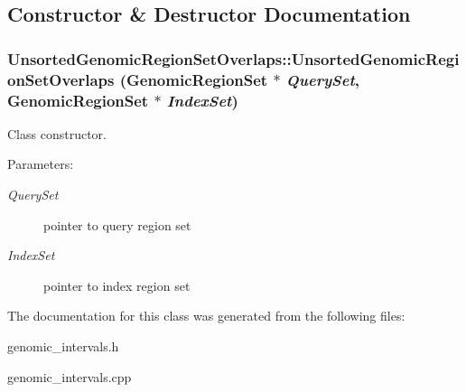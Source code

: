 \subsection{Constructor \& Destructor Documentation}
\hypertarget{classUnsortedGenomicRegionSetOverlaps_6a1255dfaac34080fae7880981b47acb}{
\subsubsection[UnsortedGenomicRegionSetOverlaps]{\setlength{\rightskip}{0pt plus 5cm}UnsortedGenomicRegionSetOverlaps::UnsortedGenomicRegionSetOverlaps ({\bf GenomicRegionSet} $\ast$ {\em QuerySet}, \/  {\bf GenomicRegionSet} $\ast$ {\em IndexSet})}}
\label{classUnsortedGenomicRegionSetOverlaps_6a1255dfaac34080fae7880981b47acb}


Class constructor. 

\begin{Desc}
\item[Parameters:]
\begin{description}
\item[{\em QuerySet}]pointer to query region set \item[{\em IndexSet}]pointer to index region set \end{description}
\end{Desc}


The documentation for this class was generated from the following files:\begin{CompactItemize}
\item 
genomic\_\-intervals.h\item 
genomic\_\-intervals.cpp\end{CompactItemize}
